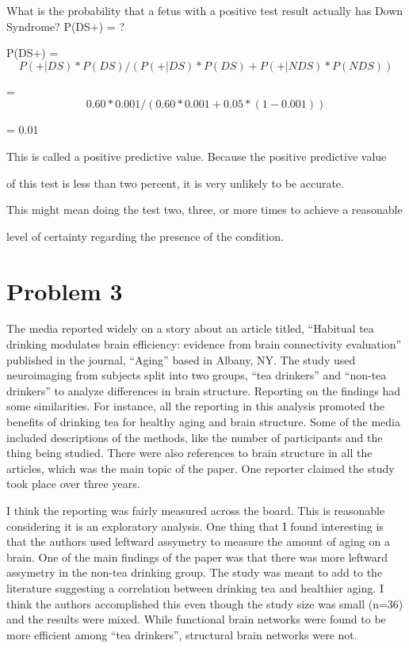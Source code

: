 \documentclass[]{article}
\begin{document}
What is the probability that a fetus with a positive test result
actually has Down Syndrome? P(DS\textbar{}+) = ?

P(DS\textbar{}+) = \[P(+|DS)*P(DS) / (P(+|DS)*P(DS)+P(+|NDS)*P(NDS))\]

= \[0.60*0.001 / (0.60*0.001+0.05*(1-0.001))\]

= 0.01

This is called a positive predictive value. Because the positive
predictive value

of this test is less than two percent, it is very unlikely to be
accurate.

This might mean doing the test two, three, or more times to achieve a
reasonable

level of certainty regarding the presence of the condition.

\hypertarget{problem-3}{%
\section{Problem 3}\label{problem-3}}

The media reported widely on a story about an article titled, ``Habitual
tea drinking modulates brain efficiency: evidence from brain
connectivity evaluation'' published in the journal, ``Aging'' based in
Albany, NY. The study used neuroimaging from subjects split into two
groups, ``tea drinkers'' and ``non-tea drinkers'' to analyze differences
in brain structure. Reporting on the findings had some similarities. For
instance, all the reporting in this analysis promoted the benefits of
drinking tea for healthy aging and brain structure. Some of the media
included descriptions of the methods, like the number of participants
and the thing being studied. There were also references to brain
structure in all the articles, which was the main topic of the paper.
One reporter claimed the study took place over three years.

I think the reporting was fairly measured across the board. This is
reasonable considering it is an exploratory analysis. One thing that I
found interesting is that the authors used leftward assymetry to measure
the amount of aging on a brain. One of the main findings of the paper
was that there was more leftward assymetry in the non-tea drinking
group. The study was meant to add to the literature suggesting a
correlation between drinking tea and healthier aging. I think the
authors accomplished this even though the study size was small (n=36)
and the results were mixed. While functional brain networks were found
to be more efficient among ``tea drinkers'', structural brain networks
were not.
\end{document}

